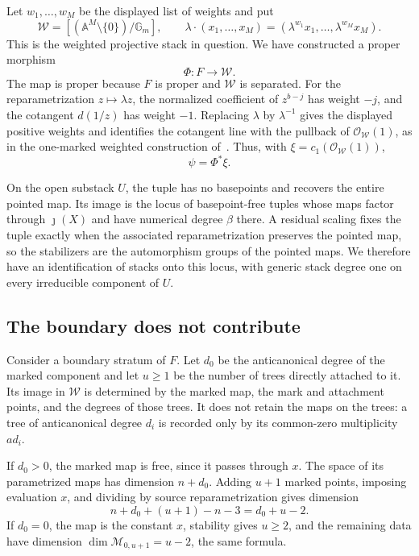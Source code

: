 Let \(w_1,\ldots,w_M\) be the displayed list of weights and put
\[
 \mathcal W=[(\mathbb A^M\setminus\{0\})/\mathbb G_m],
 \qquad \lambda\cdot(x_1,\ldots,x_M)
       =(\lambda^{w_1}x_1,\ldots,\lambda^{w_M}x_M).
\]
This is the weighted projective stack in question. We have constructed
a proper morphism
\[
  \Phi:F\longrightarrow\mathcal W.
\]
The map is proper because \(F\) is proper and \(\mathcal W\) is
separated. For the reparametrization \(z\mapsto\lambda z\), the
normalized coefficient of \(z^{b-j}\) has weight \(-j\), and the
cotangent \(d(1/z)\) has weight \(-1\). Replacing \(\lambda\) by
\(\lambda^{-1}\) gives the displayed positive weights and identifies
the cotangent line with the pullback of
\(\mathcal O_{\mathcal W}(1)\), as in the one-marked weighted construction
of~\cite[proof of Lemma~3.3]{MustataMustata2007}.  Thus, with
\(\xi=c_1(\mathcal O_{\mathcal W}(1))\),
\[
  \psi=\Phi^*\xi.
\]

On the open substack \(U\), the tuple has no basepoints and recovers
the entire pointed map.  Its image is the locus of basepoint-free
tuples whose maps factor through \(\jmath(X)\) and have numerical
degree \(\beta\) there.  A residual scaling fixes the tuple exactly
when the associated reparametrization preserves the pointed map, so
the stabilizers are the automorphism groups of the pointed maps.  We
therefore have an identification of stacks onto this locus, with
generic stack degree one on every irreducible component of \(U\).

\subsection{The boundary does not contribute}

Consider a boundary stratum of \(F\).  Let \(d_0\) be the
anticanonical degree of the marked component and let \(u\ge1\) be
the number of trees directly attached to it.  Its image in
\(\mathcal W\) is determined by the marked map, the mark and
attachment points, and the degrees of those trees.  It does not
retain the maps on the trees: a tree of anticanonical degree \(d_i\)
is recorded only by its common-zero multiplicity \(ad_i\).

If \(d_0>0\), the marked map is free, since it passes through \(x\).
The space of its parametrized maps has dimension \(n+d_0\).
Adding \(u+1\) marked points, imposing evaluation \(x\), and dividing
by source reparametrization gives dimension
\[
  n+d_0+(u+1)-n-3=d_0+u-2.
\]
If \(d_0=0\), the map is the constant \(x\), stability gives \(u\ge2\),
and the remaining data have dimension
\(\dim\mathcal M_{0,u+1}=u-2\), the same formula.

